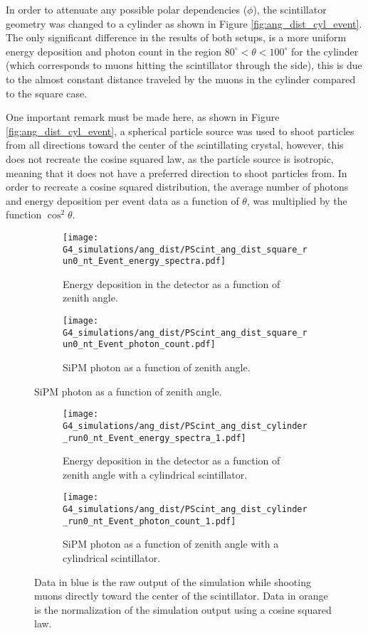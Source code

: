 In order to attenuate any possible polar dependencies ($\phi$), the scintillator geometry was changed to a cylinder as shown in Figure \ref{fig:ang_dist_cyl_event}. The only significant difference in the results of both setups, is a more uniform energy deposition and photon count in the region $80^\circ<\theta< 100^\circ$ for the cylinder (which corresponds to muons hitting the scintillator through the side), this is due to the almost constant distance traveled by the muons in the cylinder compared to the square case.

One important remark must be made here, as shown in Figure \ref{fig:ang_dist_cyl_event}, a spherical particle source was used to shoot particles from all directions toward the center of the scintillating crystal, however, this does not recreate the cosine squared law, as the particle source is isotropic, meaning that it does not have a preferred direction to shoot particles from. In order to recreate a cosine squared distribution, the average number of photons and energy deposition per event data as a function of $\theta$, was multiplied by the function $\cos^2\theta$.

\begin{figure}[H]
  \centering
  \begin{subfigure}[t]{0.49\textwidth}
    \texttt{[image: G4\_simulations/ang\_dist/PScint\_ang\_dist\_square\_run0\_nt\_Event\_energy\_spectra.pdf]}
    \caption{\label{sfig:ang_edep}Energy deposition in the detector as a function of zenith angle.}
  \end{subfigure}
  \hfill
  \begin{subfigure}[t]{0.49\textwidth}
    \texttt{[image: G4\_simulations/ang\_dist/PScint\_ang\_dist\_square\_run0\_nt\_Event\_photon\_count.pdf]}
    \caption{\label{sfig:ang_pcount}SiPM photon as a function of zenith angle.}
  \end{subfigure}
\end{figure}
\begin{figure}[H]\ContinuedFloat
  \begin{subfigure}[t]{0.49\textwidth}
    \texttt{[image: G4\_simulations/ang\_dist/PScint\_ang\_dist\_cylinder\_run0\_nt\_Event\_energy\_spectra\_1.pdf]}
    \caption{\label{sfig:ang_edep_cylinder}Energy deposition in the detector as a function of zenith angle with a cylindrical scintillator.}
  \end{subfigure}
  \hfill
  \begin{subfigure}[t]{0.49\textwidth}
    \texttt{[image: G4\_simulations/ang\_dist/PScint\_ang\_dist\_cylinder\_run0\_nt\_Event\_photon\_count\_1.pdf]}
    \caption{\label{sfig:ang_pcount_cylinder}SiPM photon as a function of zenith angle with a cylindrical scintillator.}
  \end{subfigure}
  \caption{\label{fig:ang_results}Data in blue is the raw output of the simulation while shooting muons directly toward the center of the scintillator. Data in orange is the normalization of the simulation output using a cosine squared law.}
\end{figure}

